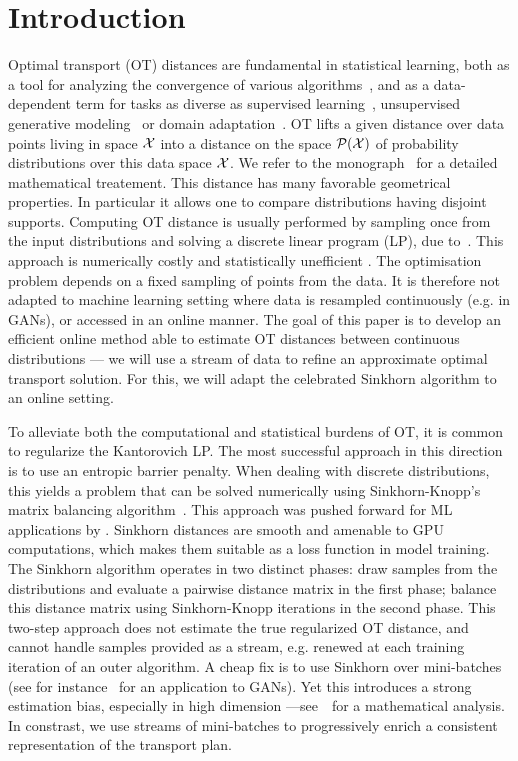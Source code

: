 \section{Introduction}

Optimal transport (OT) distances are fundamental in statistical learning, both as a tool for analyzing the convergence of various algorithms~\cite{canas2012learning,dalalyan2019user}, and as a data-dependent term for tasks as diverse as supervised learning~\cite{frogner2015learning}, unsupervised generative modeling~\cite{arjovsky2017wgan} or domain adaptation~\cite{courty2016optimal}.
%
OT lifts a given distance over data points living in space $\mathcal{X}$ into a distance
on the space $\mathcal{P}(\mathcal{X})$ of probability distributions over this data space $\mathcal{X}$. We refer to the monograph~\cite{santambrogio2015optimal} for a detailed mathematical treatement.
%
This distance has many favorable geometrical properties. In particular it allows one to compare distributions having disjoint supports. 
% 
Computing OT distance is usually performed by sampling once from the input
distributions and solving a discrete linear program (LP), due to~\citet{Kantorovich42}. This approach is numerically costly and
statistically unefficient \cite{weed2019sharp}. The optimisation problem depends
on a fixed sampling of points from the data. It is therefore not adapted to
machine learning setting where data is resampled continuously (e.g. in GANs), or
accessed in an online manner. The goal of this paper is to develop an efficient
online method able to estimate OT distances between continuous distributions ---
we will use a stream of data to refine an approximate optimal transport solution. For this, we will
adapt the celebrated Sinkhorn algorithm to an online setting.
  


To alleviate both the computational and statistical burdens of OT, it is common
to regularize the Kantorovich LP.
%
The most successful approach in this direction is to use an entropic barrier penalty. 
%
When dealing with discrete distributions, this yields a problem that can be solved
numerically using Sinkhorn-Knopp's matrix balancing
algorithm~\cite{Sinkhorn64,sinkhorn1967concerning}.
%
This approach was pushed forward for ML applications by
\citet{cuturi2013sinkhorn}. Sinkhorn distances are smooth and amenable to GPU
computations, which makes them suitable as a loss function in model training.
The Sinkhorn algorithm operates in two distinct phases: draw samples from the
distributions and evaluate a pairwise distance matrix in the first phase;
balance this distance matrix using Sinkhorn-Knopp iterations in the second
phase. This two-step approach does not estimate the true regularized OT
distance, and cannot handle samples provided as a stream, e.g. renewed at each
training iteration of an outer algorithm. A cheap fix is to use Sinkhorn over
mini-batches (see for instance~\citet{2018-Genevay-aistats} for an application
to GANs). Yet this introduces a strong estimation bias, especially in high
dimension ---see~\citet{fatras2019learning} for a mathematical analysis. In
constrast, we use streams of mini-batches to progressively enrich a consistent representation of the
transport plan.

